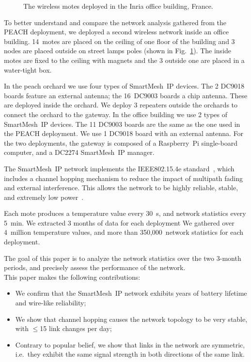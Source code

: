 \documentclass{elsarticle}
\newcommand{\smip}                {SmartMesh~IP\xspace}
\begin{document}
\begin{figure}
\begin{minipage}[b]{0.3\textwidth}
        \caption{The wireless motes deployed in the Inria office building, France.}
        \label{fig:evalab_map}
    \end{minipage}
\end{figure}


To better understand and compare the network analysis gathered from the PEACH deployment, we deployed a second wireless network inside an office building.
14~motes are placed on the ceiling of one floor of the building and 3 nodes are placed outside on street lamps poles (shown in Fig.~\ref{fig:evalab_map}).
The inside motes are fixed to the ceiling with magnets and the 3 outside one are placed in a water-tight box.


In the peach orchard we use four types of \smip devices.
The 2 DC9018 boards feature an external antenna; the 16~DC9003 boards a chip antenna.
These are deployed inside the orchard.
We deploy 3 repeaters outside the orchards to connect the orchard to the gateway.
In the office building we use 2 types of \smip devices.
The 11 DC9003 boards are the same as the one used in the PEACH deployment.
We use 1 DC9018 board with an external antenna.
For the two deployments, the gateway is composed of a Raspberry~Pi single-board computer, and a DC2274 \smip manager.


The \smip network implements the IEEE802.15.4e standard~\cite{std_ieee802154e_2012}, which includes a channel hopping mechanism to reduce the impact of multipath fading and external interference.
This allows the network to be highly reliable, stable, and extremely low power~\cite{watteyne10mitigating, watteyne09reliability}.


Each mote produces a temperature value every 30~s, and network statistics every 5~min.
We extracted 3 months of data for each deployment
We gathered over 4~million temperature values, and more than 350,000~network statistics for each deployment.


The goal of this paper is to analyze the network statistics over the two 3-month periods, and precisely assess the performance of the network.
\\

This paper makes the following contributions:
\begin{itemize}
    \item We confirm that the \smip network exhibits years of battery lifetime and wire-like reliability;
    \item We show that channel hopping causes the network topology to be very stable, with $\leq$15 link changes per day;
    \item Contrary to popular belief, we show that links in the network are symmetric, i.e.~they exhibit the same signal strength in both directions of the same link.
\end{itemize}
\end{document}
